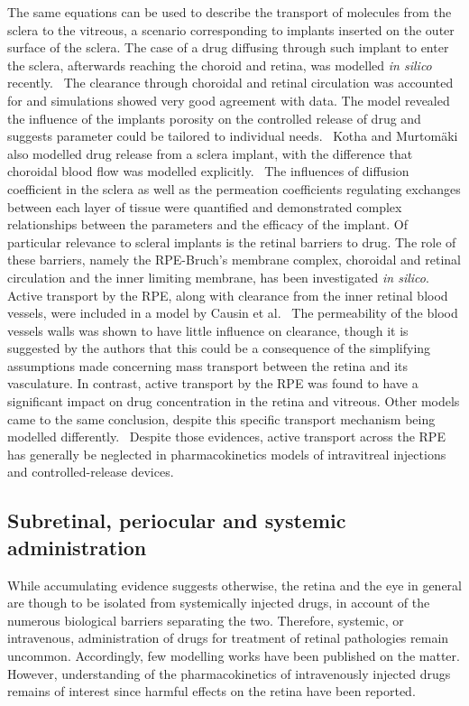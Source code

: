\documentclass[12pt,a4paper]{journal}
\begin{document}
The same equations can be used to describe the transport of molecules from the sclera to the vitreous, a scenario corresponding to implants inserted on the outer surface of the sclera.
The case of a drug diffusing through such implant to enter the sclera, afterwards reaching the choroid and retina, was modelled \textit{in silico} recently.~\cite{Abootorabi_2021}
The clearance through choroidal and retinal circulation was accounted for and simulations showed very good agreement with data.
The model revealed the influence of the implants porosity on the controlled release of drug and suggests parameter could be tailored to individual needs.~\cite{Abootorabi_2021}
Kotha and Murtom\"aki also modelled drug release from a sclera implant, with the difference that choroidal blood flow was modelled explicitly.~\cite{Kotha_2014}
The influences of diffusion coefficient in the sclera as well as the permeation coefficients regulating exchanges between each layer of tissue were quantified and demonstrated complex relationships between the parameters and the efficacy of the implant.
Of particular relevance to scleral implants is the retinal barriers to drug.
The role of these barriers, namely the RPE-Bruch's membrane complex, choroidal and retinal circulation and the inner limiting membrane, has been investigated \textit{in silico}.
Active transport by the RPE, along with clearance from the inner retinal blood vessels, were included in a model by Causin et al.~\cite{Causin_2016}
The permeability of the blood vessels walls was shown to have little influence on clearance, though it is suggested by the authors that this could be a consequence of the simplifying assumptions made concerning mass transport between the retina and its vasculature.
In contrast, active transport by the RPE was found to have a significant impact on drug concentration in the retina and vitreous.
Other models came to the same conclusion, despite this specific transport mechanism being modelled differently.~\cite{Balachandran_2008,Kotha_2014}
Despite those evidences, active transport across the RPE has generally be neglected in pharmacokinetics models of intravitreal injections and controlled-release devices.


\subsection*{Subretinal, periocular and systemic administration}

While accumulating evidence suggests otherwise, the retina and the eye in general are though to be isolated from systemically injected drugs, in account of the numerous biological barriers separating the two.
Therefore, systemic, or intravenous, administration of drugs for treatment of retinal pathologies remain uncommon.
Accordingly, few modelling works have been published on the matter.
However, understanding of the pharmacokinetics of intravenously injected drugs remains of interest since harmful effects on the retina have been reported.\cite{Fu_2017}
\end{document}

